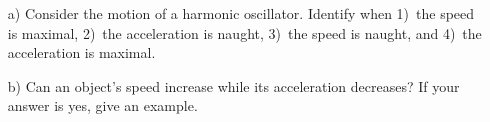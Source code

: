 %
%

\begin{center}
\vspace*{5mm}
\end{center}

\begin{enumerate}
\item[a)] Consider the motion of a harmonic oscillator. Identify when 1)~the speed is maximal, 2)~the  acceleration is naught, 3)~the speed is naught, and 4)~the acceleration is maximal.


\item[b)] Can an object's speed increase while its acceleration decreases? If your answer is yes, give an example. 
\end{enumerate}
